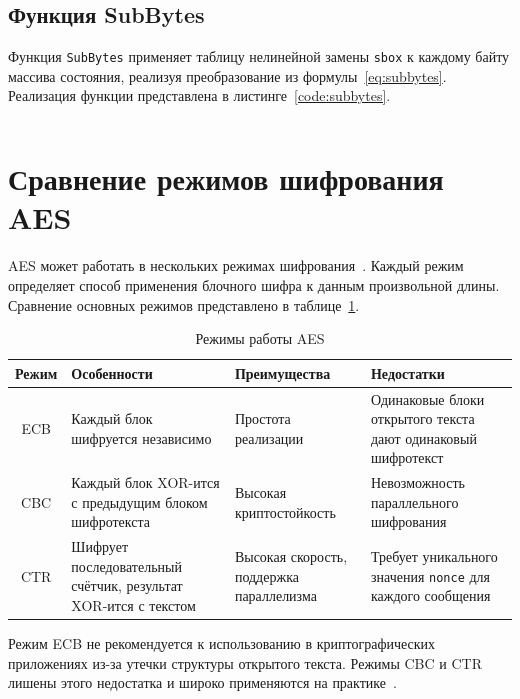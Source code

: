 \documentclass[coursework]{SCWorks}
\begin{document}
\subsection{Функция SubBytes}

Функция \texttt{SubBytes} применяет таблицу нелинейной замены
\texttt{sbox} к каждому байту массива состояния, реализуя
преобразование из формулы~\eqref{eq:subbytes}. Реализация функции представлена
в листинге~\ref{code:subbytes}.

\begin{listing}[htbp]
    \caption{Функция \texttt{SubBytes}}
    \label{code:subbytes}
    \inputminted{cpp}{code/sub_bytes.cpp}
\end{listing}

\section{Сравнение режимов шифрования AES}

AES может работать в нескольких режимах шифрования~\cite{nist800}.
Каждый режим определяет способ применения блочного шифра к данным произвольной
длины. Сравнение основных режимов представлено в таблице~\ref{tab:modes}.

\begin{table}[h]
    \centering
    \caption{Режимы работы AES}
    \begin{tabular}{|c|p{4cm}|p{4cm}|p{4cm}|}
        \hline
        Режим & Особенности & Преимущества & Недостатки \\
        \hline
        ECB & Каждый блок шифруется независимо & Простота реализации &
        Одинаковые блоки открытого текста дают одинаковый шифротекст \\
        \hline
        CBC & Каждый блок XOR-ится с предыдущим блоком шифротекста &
        Высокая криптостойкость &
        Невозможность параллельного шифрования \\
        \hline
        CTR & Шифрует последовательный счётчик, результат XOR-ится с текстом &
        Высокая скорость, поддержка параллелизма &
        Требует уникального значения \texttt{nonce} для каждого сообщения \\
        \hline
    \end{tabular}
    \label{tab:modes}
\end{table}

Режим ECB не рекомендуется к использованию в криптографических приложениях
из-за утечки структуры открытого текста. Режимы CBC и CTR лишены этого
недостатка и широко применяются на практике~\cite{nist800}.
\end{document}
